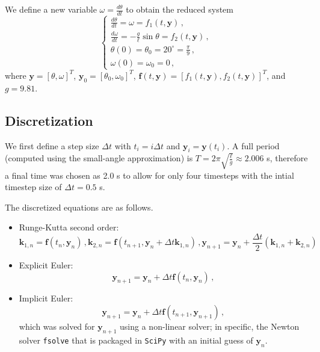 \documentclass{article}
\newcommand{\vy}{\mathbf{y}} %
\begin{document}
We define a new variable $\omega = \frac{d \theta}{dt}$ to obtain the reduced system
\begin{equation}
	\begin{cases}
		\frac{d\theta}{dt} = \omega = f_1(t, \vy)\,,\\
		\frac{d\omega}{dt} = - \frac{g}{\ell} \sin \theta = f_2(t, \vy)\,,\\
		\theta(0) = \theta_0 = 20^\circ = \frac{\pi}{9}\,,\\
		\omega(0) = \omega_0 = 0\,,
	\end{cases}
\end{equation}
where $\vy = [\theta, \omega]^T$, $\vy_0 = [\theta_0, \omega_0]^T$, $\mathbf{f}(t, \vy) = [f_1(t, \vy), f_2(t, \vy)]^T$, and $g = 9.81$.

\subsection*{Discretization}

We first define a step size $\Delta t$ with $t_i = i \Delta t$ and $\vy_i = \vy(t_i)$. A full period (computed using the small-angle approximation) is $T = 2 \pi \sqrt{\frac{\ell}{g}} \approx 2.006$ s, therefore a final time was chosen as 2.0 s to allow for only four timesteps with the intial timestep size of $\Delta t = 0.5$ s.

The discretized equations are as follows.

\begin{itemize}
	\item Runge-Kutta second order:
	\begin{subequations}
		\begin{equation}
			\mathbf{k}_{1,n} = \mathbf{f}(t_n, \vy_n)\,,
		\end{equation}
		\begin{equation}
			\mathbf{k}_{2,n} = \mathbf{f}(t_{n+1}, \vy_n + \Delta t \mathbf{k}_{1,n})\,,
		\end{equation}
		\begin{equation}
			\vy_{n+1} = \vy_n + \frac{\Delta t}{2} (\mathbf{k}_{1,n} + \mathbf{k}_{2,n})
		\end{equation}
	\end{subequations}

	\item Explicit Euler:
	\begin{equation}
		\vy_{n+1} = \vy_n + \Delta t \mathbf{f}(t_n, \vy_n)\,,
	\end{equation}

	\item Implicit Euler:
	\begin{equation}
		\vy_{n+1} = \vy_n + \Delta t \mathbf{f}(t_{n+1}, \vy_{n+1}) \,,
	\end{equation}
	which was solved for $\vy_{n+1}$ using a non-linear solver; in specific, the Newton solver \texttt{fsolve} that is packaged in \texttt{SciPy} with an initial guess of $\vy_n$.
\end{itemize}
\end{document}
